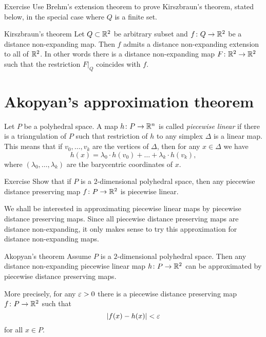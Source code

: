 \begin{thm}{Exercise}\label{pr:brehm}
Use Brehm's extension theorem 
to prove Kirszbraun's theorem, stated below, in the special case where $Q$ is a finite set.
\end{thm}



\begin{thm}{Kirszbraun's theorem}
Let $Q\subset \mathbb{R}^2$ be arbitrary subset and $f\colon Q\to\mathbb{R}^2$ be a distance non-expanding map.
Then $f$ admits 
a distance non-expanding extension to all of $\mathbb{R}^2$.
In other words there is a distance  non-expanding map $F\colon\mathbb{R}^2\to\mathbb{R}^2$ 
such that the restriction $F|_{Q}$ coincides with $f$.
\end{thm}



\section{Akopyan's approximation theorem}

Let $P$ be a polyhedral space.
A map $h\colon P\to\mathbb{R}^n$ is called 
\emph{piecewise linear}\label{page:piecewise linear map}
if there is a triangulation of $P$ such that 
restriction of $h$ to any simplex $\Delta$ is a linear map.
This means that if $v_0,\dots,v_k$ are the vertices of $\Delta$,
then for any $x\in \Delta$ we have
\[h(x)
=
\lambda_0\cdot h(v_0)+\dots+\lambda_k\cdot h(v_k),\]
where $(\lambda_0,\dots,\lambda_k)$ are the barycentric coordinates of $x$.

\begin{thm}{Exercise}\label{ex:PDPisPL}
Show that if $P$ is a $2$-dimensional polyhedral space, then any piecewise distance preserving map $f\colon P \to \mathbb{R}^2$ is piecewise linear.
\end{thm}

We shall be interested in approximating piecewise linear maps by piecewise distance preserving maps.  Since all piecewise distance preserving maps are distance non-expanding, it only makes sense to try this approximation for distance non-expanding maps.

\begin{thm}{Akopyan's theorem}\label{thm:approx}
Assume $P$ is a $2$-dimensional polyhedral space.
Then any distance non-expanding piecewise linear map 
$h\:P\z\to\RR^2$ can be approximated 
by piecewise distance preserving maps.

More precisely, for any $\varepsilon>0$ there is a piecewise distance preserving map $f\colon P\to\mathbb{R}^2$
such that 
$$|f(x)-h(x)|<\varepsilon$$
for all $x\in P$.
\end{thm}


